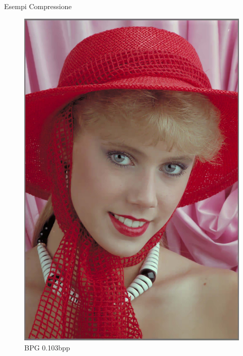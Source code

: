 \begin{frame}{Esempi Compressione}
\begin{figure}[!ht]
\begin{minipage}[]{0.13\linewidth}
                \includegraphics[width=\textwidth]{Immagini/IMAGES/BPG_2_IMG0004.pdf}
                \caption{BPG 0.103bpp}
                \label{fig:ExampleBPG}
            \end{minipage}
            \begin{minipage}[]{0.13\linewidth}
                \centering

\end{minipage}
\end{figure}
\end{frame}
